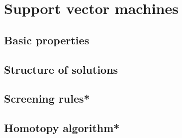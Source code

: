 \chapter{Support vector machines}
\label{chap:svm}


\section{Basic properties}

\section{Structure of solutions}
\label{sec:svm_structure}


\section{Screening rules*}


\section{Homotopy algorithm*}

